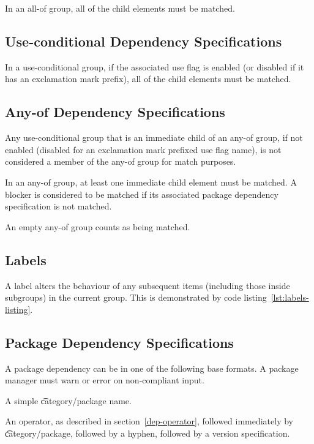 In an all-of group, all of the child elements must be matched.

\subsection{Use-conditional Dependency Specifications}

In a use-conditional group, if the associated use flag is enabled (or disabled if it has an
exclamation mark prefix), all of the child elements must be matched.

\subsection{Any-of Dependency Specifications}

Any use-conditional group that is an immediate child of an any-of group, if not enabled (disabled
for an exclamation mark prefixed use flag name), is not considered a member of the any-of group
for match purposes.

In an any-of group, at least one immediate child element must be matched. A blocker is
considered to be matched if its associated package dependency specification is not matched.

An empty any-of group counts as being matched.

\IFKDEBUILDELSE
{
    \subsection{Labels}
    \label{labels}

    A label alters the behaviour of any subsequent items (including those inside subgroups) in the
    current group. This is demonstrated by code listing~\ref{lst:labels-listing}.


}{
}

\subsection{Package Dependency Specifications}

A package dependency can be in one of the following base formats. A package manager must warn or
error on non-compliant input.

\begin{compactitem}
\item A simple \t{category/package} name.
\item An operator, as described in section~\ref{dep-operator}, followed immediately by
    \t{category/package}, followed by a hyphen, followed by a version specification.
\end{compactitem}

